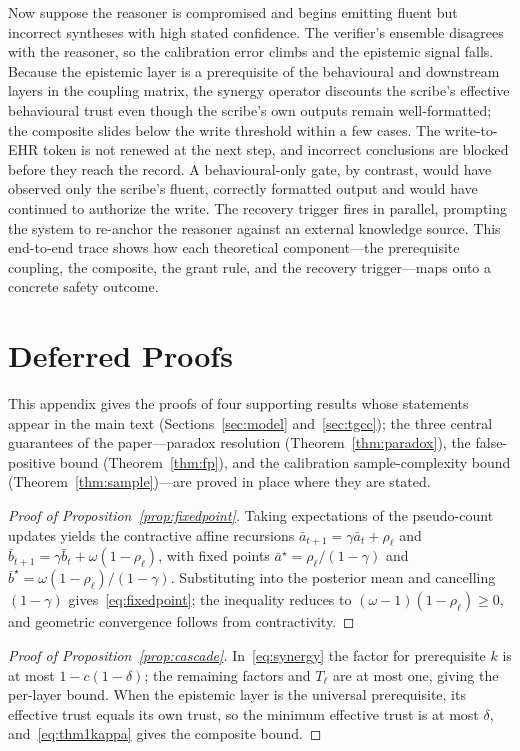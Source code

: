 \documentclass[sigconf,anonymous]{acmart}
\theoremstyle{plain}
\theoremstyle{definition}
\theoremstyle{remark}
\begin{document}
Now suppose the reasoner is compromised and begins emitting fluent but incorrect
syntheses with high stated confidence. The verifier's ensemble disagrees with the
reasoner, so the calibration error climbs and the epistemic signal falls. Because the
epistemic layer is a prerequisite of the behavioural and downstream layers in the coupling
matrix, the synergy operator discounts the scribe's effective behavioural trust even
though the scribe's own outputs remain well-formatted; the composite slides below the
write threshold within a few cases. The write-to-EHR token is not renewed at the next
step, and incorrect conclusions are blocked before they reach the record. A
behavioural-only gate, by contrast, would have observed only the scribe's fluent,
correctly formatted output and would have continued to authorize the write. The recovery
trigger fires in parallel, prompting the system to re-anchor the reasoner against an
external knowledge source. This end-to-end trace shows how each theoretical
component---the prerequisite coupling, the composite, the grant rule, and the recovery
trigger---maps onto a concrete safety outcome.

\section{Deferred Proofs}
\label{app:proofs}
This appendix gives the proofs of four supporting results whose statements appear in the
main text (Sections~\ref{sec:model} and~\ref{sec:tgcc}); the three central guarantees of
the paper---paradox resolution (Theorem~\ref{thm:paradox}), the false-positive bound
(Theorem~\ref{thm:fp}), and the calibration sample-complexity bound
(Theorem~\ref{thm:sample})---are proved in place where they are stated.

\begin{proof}[Proof of Proposition~\ref{prop:fixedpoint}]
Taking expectations of the pseudo-count updates yields the contractive affine recursions
$\bar a_{t+1}=\gamma\bar a_t+\rho_\ell$ and $\bar b_{t+1}=\gamma\bar b_t+\omega(1-\rho_\ell)$,
with fixed points $\bar a^\star=\rho_\ell/(1-\gamma)$ and
$\bar b^\star=\omega(1-\rho_\ell)/(1-\gamma)$. Substituting into the posterior mean and
cancelling $(1-\gamma)$ gives~\eqref{eq:fixedpoint}; the inequality reduces to
$(\omega-1)(1-\rho_\ell)\ge0$, and geometric convergence follows from contractivity.
\end{proof}

\begin{proof}[Proof of Proposition~\ref{prop:cascade}]
In~\eqref{eq:synergy} the factor for prerequisite $k$ is at most $1-c(1-\delta)$; the
remaining factors and $T_\ell$ are at most one, giving the per-layer bound. When the
epistemic layer is the universal prerequisite, its effective trust equals its own trust,
so the minimum effective trust is at most $\delta$, and~\eqref{eq:thm1kappa} gives the
composite bound.
\end{proof}
\end{document}
